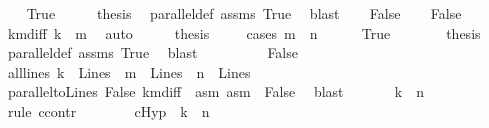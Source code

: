\begin{isabellebody}
\ \ \isamarkupfalse%
\ True\isanewline
\ \ \isamarkupfalse%
\ \isamarkupfalse%
\ {\isacharquery}{\kern0pt}thesis\ \isamarkupfalse%
\ parallel{\isacharunderscore}{\kern0pt}def\ assms\ True\ \isamarkupfalse%
\ blast\isanewline
{}\isamarkupfalse%
\isanewline
\ \ \isamarkupfalse%
\ False\isanewline
\ \ \isamarkupfalse%
\ False\ \isamarkupfalse%
\ kmdiff{}{\isacharcolon}{\kern0pt}\ {\isachardoublequoteopen}k\ {\isasymnoteq}\ m{\isachardoublequoteclose}\ \isamarkupfalse%
\ auto\isanewline
\ \ \isamarkupfalse%
\ \isamarkupfalse%
\ {\isacharquery}{\kern0pt}thesis\ \isanewline
\ \ \isamarkupfalse%
\ {\isacharparenleft}{\kern0pt}cases\ {\isachardoublequoteopen}m\ {\isacharequal}{\kern0pt}\ n{\isachardoublequoteclose}{\isacharparenright}{\kern0pt}\isanewline
\ \ \ \ \isamarkupfalse%
\ True\isanewline
\ \ \ \ \isamarkupfalse%
\ \isamarkupfalse%
\ {\isacharquery}{\kern0pt}thesis\ \isamarkupfalse%
\ parallel{\isacharunderscore}{\kern0pt}def\ assms\ True\ \isamarkupfalse%
\ blast\ \isanewline
\ \ \isamarkupfalse%
\isanewline
\ \ \ \ \isamarkupfalse%
\ False\isanewline
\ \ \ \ \isamarkupfalse%
\ all{\isacharunderscore}{\kern0pt}lines{\isacharcolon}{\kern0pt}\ {\isachardoublequoteopen}k\ {\isasymin}\ Lines\ {\isasymand}\ m\ {\isasymin}\ Lines\ {\isasymand}\ n\ {\isasymin}\ Lines{\isachardoublequoteclose}\ \ \isamarkupfalse%
\ parallel{\isacharunderscore}{\kern0pt}to{\isacharunderscore}{\kern0pt}Lines\ False\ kmdiff{}\ \ asm{}\ asm{}\ \ False\ \isamarkupfalse%
\ blast\ \isanewline
\ \ \ \ \isamarkupfalse%
\ {\isachardoublequoteopen}k\ {\isacharbar}{\kern0pt}{\isacharbar}{\kern0pt}\ n{\isachardoublequoteclose}\isanewline
\ \ \ \ \isamarkupfalse%
\ {\isacharparenleft}{\kern0pt}rule\ ccontr{\isacharparenright}{\kern0pt}\isanewline
\ \ \ \ \ \ \isamarkupfalse%
\ cHyp{\isacharcolon}{\kern0pt}\ {\isachardoublequoteopen}{\isasymnot}\ {\isacharparenleft}{\kern0pt}k\ {\isacharbar}{\kern0pt}{\isacharbar}{\kern0pt}\ n{\isacharparenright}{\kern0pt}{\isachardoublequoteclose}\isanewline
\ \ \ \ \ \ \isamarkupfalse%

\end{isabellebody}
